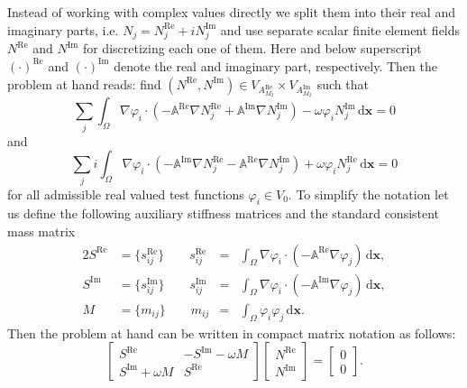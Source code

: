 \documentclass[11pt,a4paper]{article}
\begin{document}
Instead of working with complex values directly we split them into their real and imaginary parts, i.e. $N_j=N_j^\mathrm{Re}+iN_j^\mathrm{Im}$ and use separate scalar finite element fields $N^\mathrm{Re}$ and $N^\mathrm{Im}$ for discretizing each one of them. Here and below superscript $(\cdot)^\mathrm{Re}$ and $(\cdot)^\mathrm{Im}$ denote the real and imaginary part, respectively. Then the problem at hand reads: find $(N^\mathrm{Re},N^\mathrm{Im})\in V_{A_{M_2}^\mathrm{Re}}\times V_{A_{M_2}^\mathrm{Im}}$ such that
\begin{equation}
\sum_j\int_\Omega \nabla\varphi_i\cdot\left(-\mathbb{A}^\mathrm{Re}\nabla N_j^\mathrm{Re}+\mathbb{A}^\mathrm{Im}\nabla N_j^\mathrm{Im}\right)-\omega \varphi_i N_j^\mathrm{Im}\,\mathrm{d}\mathbf{x}=0
\end{equation}
and
\begin{equation}
\sum_ji\int_\Omega \nabla\varphi_i\cdot\left(-\mathbb{A}^\mathrm{Im}\nabla N_j^\mathrm{Re}-\mathbb{A}^\mathrm{Re}\nabla N_j^\mathrm{Im}\right)+\omega \varphi_i N_j^\mathrm{Re}\,\mathrm{d}\mathbf{x}=0
\end{equation}
for all admissible real valued test functions $\varphi_i\in V_{0}$.
To simplify the notation let us define the following auxiliary stiffness matrices and the standard consistent mass matrix
\begin{alignat}{2}
S^\mathrm{Re}&=\{s_{ij}^\mathrm{Re}\} \qquad s_{ij}^\mathrm{Re}&=&\int_\Omega \nabla\varphi_i\cdot(-\mathbb{A}^\mathrm{Re}\nabla\varphi_j)\,\mathrm{d}\mathbf{x},\\
S^\mathrm{Im}&=\{s_{ij}^\mathrm{Im}\} \qquad s_{ij}^\mathrm{Im}&=&\int_\Omega \nabla\varphi_i\cdot(-\mathbb{A}^\mathrm{Im}\nabla\varphi_j)\,\mathrm{d}\mathbf{x},\\
M&=\{m_{ij}\} \qquad m_{ij}&=&\int_\Omega \varphi_i\varphi_j\,\mathrm{d}\mathbf{x}.
\end{alignat}
Then the problem at hand can be written in compact matrix notation as follows:
\begin{equation}
\begin{bmatrix}
S^\mathrm{Re} & -S^\mathrm{Im}-\omega M\\
S^\mathrm{Im}+\omega M &  S^\mathrm{Re}
\end{bmatrix}
\begin{bmatrix}
N^\mathrm{Re}\\
N^\mathrm{Im}
\end{bmatrix}
=
\begin{bmatrix}
0\\
0
\end{bmatrix}.
\end{equation}
\end{document}
